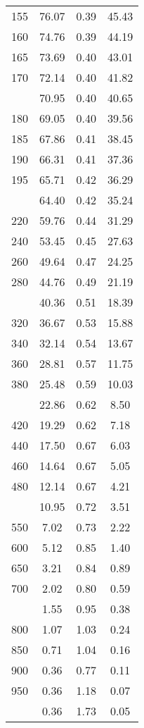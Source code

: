 \begin{table}[ht]
\begin{tabular}{lccc}
  155 & 76.07 & 0.39 & 45.43 \\ 
  160 & 74.76 & 0.39 & 44.19 \\ 
  165 & 73.69 & 0.40 & 43.01 \\ 
  170 & 72.14 & 0.40 & 41.82 \\ 
   \addlinespace
175 & 70.95 & 0.40 & 40.65 \\ 
  180 & 69.05 & 0.40 & 39.56 \\ 
  185 & 67.86 & 0.41 & 38.45 \\ 
  190 & 66.31 & 0.41 & 37.36 \\ 
  195 & 65.71 & 0.42 & 36.29 \\ 
   \addlinespace
200 & 64.40 & 0.42 & 35.24 \\ 
  220 & 59.76 & 0.44 & 31.29 \\ 
  240 & 53.45 & 0.45 & 27.63 \\ 
  260 & 49.64 & 0.47 & 24.25 \\ 
  280 & 44.76 & 0.49 & 21.19 \\ 
   \addlinespace
300 & 40.36 & 0.51 & 18.39 \\ 
  320 & 36.67 & 0.53 & 15.88 \\ 
  340 & 32.14 & 0.54 & 13.67 \\ 
  360 & 28.81 & 0.57 & 11.75 \\ 
  380 & 25.48 & 0.59 & 10.03 \\ 
   \addlinespace
400 & 22.86 & 0.62 & 8.50 \\ 
  420 & 19.29 & 0.62 & 7.18 \\ 
  440 & 17.50 & 0.67 & 6.03 \\ 
  460 & 14.64 & 0.67 & 5.05 \\ 
  480 & 12.14 & 0.67 & 4.21 \\ 
   \addlinespace
500 & 10.95 & 0.72 & 3.51 \\ 
  550 & 7.02 & 0.73 & 2.22 \\ 
  600 & 5.12 & 0.85 & 1.40 \\ 
  650 & 3.21 & 0.84 & 0.89 \\ 
  700 & 2.02 & 0.80 & 0.59 \\ 
   \addlinespace
750 & 1.55 & 0.95 & 0.38 \\ 
  800 & 1.07 & 1.03 & 0.24 \\ 
  850 & 0.71 & 1.04 & 0.16 \\ 
  900 & 0.36 & 0.77 & 0.11 \\ 
  950 & 0.36 & 1.18 & 0.07 \\ 
   \addlinespace
1000 & 0.36 & 1.73 & 0.05 \\ 
   \bottomrule
\end{tabular}
\end{table}
